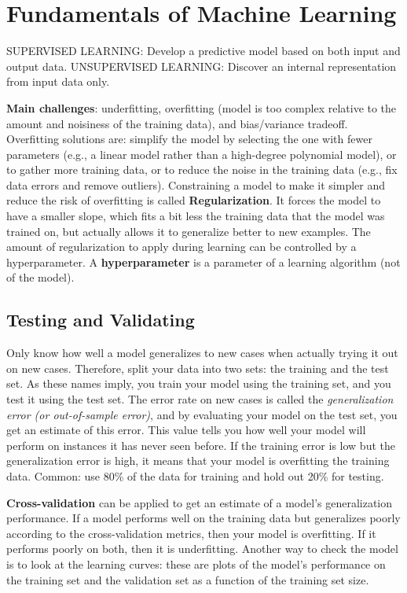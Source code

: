 \section*{Fundamentals of Machine Learning}
SUPERVISED LEARNING: Develop a predictive model based on both input and output data.
UNSUPERVISED LEARNING: Discover an internal representation from input data only.

\textbf{Main challenges}: underfitting, overfitting (model is too complex relative to the amount and noisiness of the training data), and bias/variance tradeoff.
Overfitting solutions are: simplify the model by selecting the one with fewer parameters (e.g., a linear model rather than a high-degree polynomial model),
or to gather more training data,
or to reduce the noise in the training data (e.g., fix data errors and remove outliers).
Constraining a model to make it simpler and reduce the risk of overfitting is called
\textbf{Regularization}. 
It forces the model to have a smaller slope, which fits a bit less the training data that the model was trained on, but actually allows it to generalize better to new examples.
The amount of regularization to apply during learning can be controlled by a hyperparameter. 
A \textbf{hyperparameter} is a parameter of a learning algorithm (not of the model).

\subsection*{Testing and Validating}
Only know how well a model generalizes to new cases when actually trying it out on new cases. Therefore, split your data into two sets:
the training and the test set. As these names imply, you train your model using the training set, and you test it using the test set.
The error rate on new cases is called the \textit{generalization error (or out-of-sample error)}, and by evaluating your model on the test set, you get an estimate of this error.
This value tells you how well your model will perform on instances it has never seen before.
If the training error is low but the generalization error is high, it means that your model is overfitting the training data.
Common: use 80\% of the data for training and hold out 20\% for testing.

\textbf{Cross-validation} can be applied to get an estimate of a model’s generalization performance.
If a model performs well on the training data but generalizes poorly according to the cross-validation metrics, then your model is overfitting.
If it performs poorly on both, then it is underfitting. 
Another way to check the model is to look at the learning curves: these are plots of the model’s performance on the training set and the validation set as a function of the training set size.

